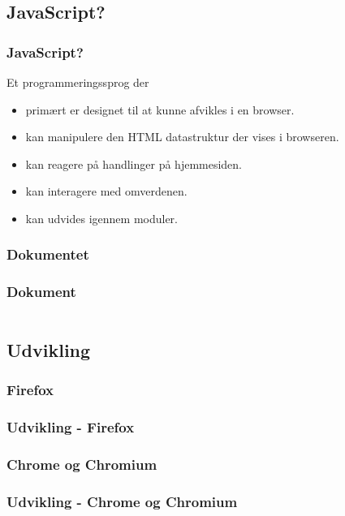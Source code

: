 \subsection{JavaScript?}
\begin{frame}
    \frametitle{JavaScript?}
    Et programmeringssprog der
    \begin{itemize}
      \item primært er designet til at kunne afvikles i en browser.
      \item kan manipulere den HTML datastruktur der vises i browseren.
      \item kan reagere på handlinger på hjemmesiden.
      \item kan interagere med omverdenen.
      \item kan udvides igennem moduler.
    \end{itemize}
\end{frame}

\subsubsection{Dokumentet}
\begin{frame}
    \frametitle{Dokument}
    \inputminted{html}{../src/frontend/part2_hello/index.html}
\end{frame}

\subsection{Udvikling}

\subsubsection{Firefox}
\begin{frame}
    \frametitle{Udvikling - Firefox}
    \begin{center}
    \end{center}
\end{frame}

\subsubsection{Chrome og Chromium}
\begin{frame}
    \frametitle{Udvikling - Chrome og Chromium}
    \begin{center}
    \end{center}
\end{frame}


